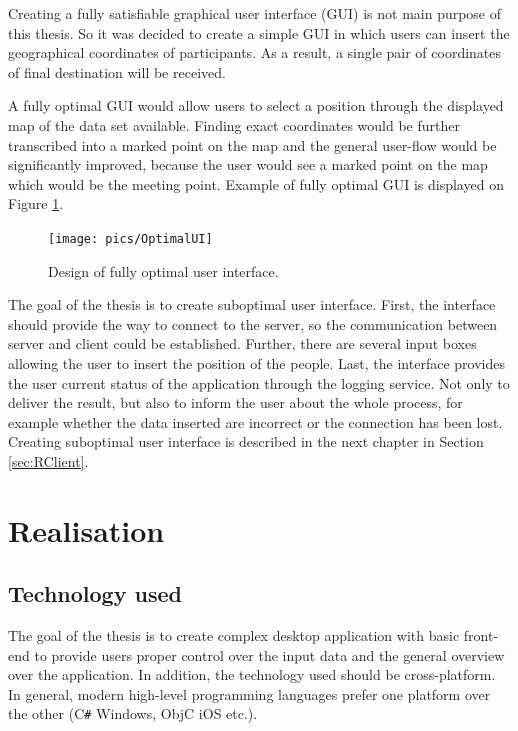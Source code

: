 \documentclass[thesis=M,english]{FITthesis}[2012/10/20]
\begin{document}
Creating a fully satisfiable graphical user interface (GUI) is not main purpose of this thesis. So it was decided to create a simple GUI in which users can insert the geographical coordinates of participants. As a result, a single pair of coordinates of final destination will be received. 

A fully optimal GUI would allow users to select a position through the displayed map of the data set available. Finding exact coordinates would be further transcribed into a marked point on the map and the general user-flow would be significantly improved, because the user would see a marked point on the map which would be the meeting point. Example of fully optimal GUI is displayed on Figure \ref{fig:OptUI}.


\begin{figure}[H]
\centering
\texttt{[image: pics/OptimalUI]}
\caption{Design of fully optimal user interface.}
\label{fig:OptUI}
\end{figure}

The goal of the thesis is to create suboptimal user interface. First, the interface should provide the way to connect to the server, so the communication between server and client could be established. Further, there are several input boxes allowing the user to insert the position of the people. Last, the interface provides the user current status of the application through the logging service. Not only to deliver the result, but also to inform the user about the whole process, for example whether the data inserted are incorrect or the connection has been lost.
Creating suboptimal user interface is described in the next chapter in Section \ref{sec:RClient}.

\chapter{Realisation}
\label{ch:Realisation}

\section{Technology used}
\label{sec:TechUsed}
The goal of the thesis is to create complex desktop application with basic front-end to provide users proper control over the input data and the general overview over the application. In addition, the technology used should be cross-platform. In general, modern high-level programming languages prefer one platform over the other (C\texttt{\#} Windows, ObjC iOS etc.). 
\end{document}
